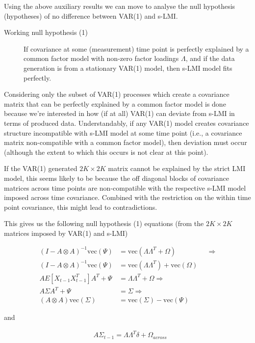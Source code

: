 \documentclass[
  letterpaper,
  DIV=11,
  numbers=noendperiod]{scrartcl}
\begin{document}
Using the above auxiliary results we can move to analyse the null
hypothesis (hypotheses) of no difference between VAR(1) and s-LMI.

\begin{description}
\item[Working null hypothesis (1)]
If covariance at some (measurement) time point is perfectly explained by
a common factor model with non-zero factor loadings \(\Lambda\), and if
the data generation is from a stationary VAR(1) model, then s-LMI model
fits perfectly.
\end{description}

Considering only the subset of VAR(1) processes which create a
covariance matrix that can be perfectly explained by a common factor
model is done because we're interested in how (if at all) VAR(1) can
deviate from s-LMI in terms of produced data. Understandably, if any
VAR(1) model creates covariance structure incompatible with s-LMI model
at some time point (i.e., a covariance matrix non-compatible with a
common factor model), then deviation must occur (although the extent to
which this occurs is not clear at this point).

If the VAR(1) generated \(2K\times2K\) matrix cannot be explained by the
strict LMI model, this seems likely to be because the off diagonal
blocks of covariance matrices across time points are non-compatible with
the respective s-LMI model imposed across time covariance. Combined with
the restriction on the within time point covariance, this might lead to
contradictions.

This gives us the following null hypothesis (1) equations (from the
\(2K\times2K\) matrices imposed by VAR(1) and s-LMI)

\[
\begin{align*}
(I-A \otimes A)^{-1} \text{vec}(\Psi) &= \text{vec}(\Lambda \Lambda^T + \Omega)&&\Rightarrow
\\
(I-A \otimes A)^{-1} \text{vec}(\Psi) &= \text{vec}(\Lambda \Lambda^T) + \text{vec}(\Omega)
\\
AE[X_{t-1}X_{t-1}^T]A^T + \Psi&=\Lambda \Lambda^T + \Omega\Rightarrow
\\
A\Sigma A^T+\Psi&=\Sigma\Rightarrow\\
(A\otimes A)\text{vec}(\Sigma)&=\text{vec}(\Sigma)-\text{vec}(\Psi)
\end{align*}
\]

and

\[
\begin{align*}
&A\Sigma_{t-1}=\Lambda\Lambda^T\delta+\Omega_{across}
\end{align*}
\]
\end{document}
